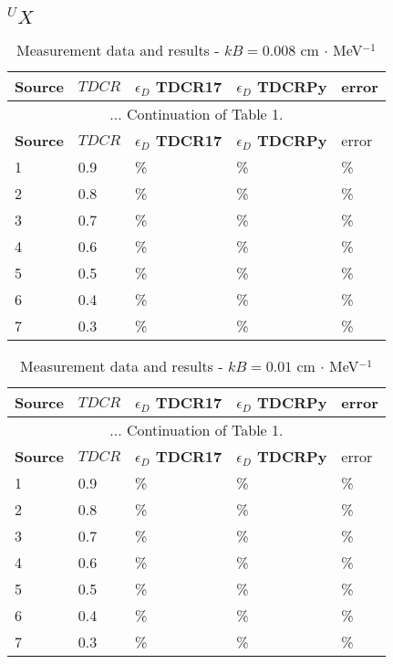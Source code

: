 \documentclass[12pt]{iopart}
\begin{document}
\subsection{$^{U}X$}

\begingroup
\footnotesize
\begin{longtable}[l]{| p{} | p{} |p{} |p{} |p{} |} 
\caption{Measurement data and results - $kB = 0.008$ cm $\cdot$ MeV$^{-1}$}
\label{Table1} \\ 
\hline
\textbf{Source} & \textbf{$TDCR$} & \textbf{$\epsilon_{D}$ TDCR17} & \textbf{$\epsilon_{D}$ TDCRPy} & error \\
\endfirsthead
\multicolumn{5}{c}{... Continuation of Table 1.}\\ 
\hline
 \textbf{Source} & \textbf{$TDCR$} & \textbf{$\epsilon_{D}$ TDCR17} & \textbf{$\epsilon_{D}$ TDCRPy} & error \\   \hline 
\endhead
\hline
 1 & 0.9   &    \% &    \% &   \% \\
 2 & 0.8   &    \% &    \% &   \% \\
 3 & 0.7   &    \% &    \% &   \% \\
 4 & 0.6   &    \% &    \% &   \% \\
 5 & 0.5   &    \% &    \% &   \% \\
 6 & 0.4   &    \% &    \% &   \% \\
 7 & 0.3   &    \% &    \% &   \% \\
\hline
\end{longtable} 
\endgroup

\pagebreak

\begingroup
\footnotesize
\begin{longtable}[l]{| p{} | p{} | p{} |p{} |p{} |} 
\caption{Measurement data and results - $kB = 0.01$ cm $\cdot$ MeV$^{-1}$}
\label{Table1} \\ 
\hline
\textbf{Source} & \textbf{$TDCR$} & \textbf{$\epsilon_{D}$ TDCR17} & \textbf{$\epsilon_{D}$ TDCRPy} & error \\ 
\endfirsthead
\multicolumn{5}{c}{... Continuation of Table 1.}\\ 
\hline
 \textbf{Source} & \textbf{$TDCR$} & \textbf{$\epsilon_{D}$ TDCR17} & \textbf{$\epsilon_{D}$ TDCRPy} & error \\   \hline 
\endhead
\hline
 1 &  0.9  &   \% &    \% &  \% \\
 2 &  0.8  &   \% &    \% &  \% \\
 3 &  0.7  &   \% &    \% &  \% \\
 4 &  0.6  &   \% &    \% &  \% \\
 5 &  0.5  &   \% &    \% &  \% \\
 6 &  0.4  &   \% &    \% &  \% \\
 7 &  0.3  &   \% &    \% &  \% \\
\hline
\end{longtable} 
\endgroup
\end{document}
